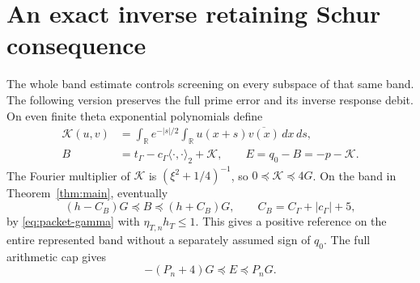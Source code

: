\documentclass[11pt]{article}
\theoremstyle{remark}
\newcommand{\R}{\mathbb R}
\newcommand{\ip}[2]{\langle #1,#2\rangle}
\newcommand{\tg}{t_\Gamma}
\newcommand{\cg}{c_\Gamma}
\begin{document}
\section{An exact inverse retaining Schur consequence}\label{sec:schur}
The whole band estimate controls screening on every subspace of that same
band. The following version preserves the full prime error and its
inverse response debit.
On even finite theta exponential polynomials define
\begin{equation}\label{eq:reference}
\begin{split}
 \mathcal K(u,v)&=\int_\R e^{-|s|/2}
                     \int_\R u(x+s)\overline{v(x)}\,dx\,ds,\\
 B&=\tg-\cg\ip{\cdot}{\cdot}_2+\mathcal K,\qquad
 E=q_0-B=-p-\mathcal K.
\end{split}
\end{equation}
The Fourier multiplier of $\mathcal K$ is $(\xi^2+1/4)^{-1}$, so
$0\preceq\mathcal K\preceq4G$.
On the band in Theorem~\ref{thm:main}, eventually
\begin{equation}\label{eq:reference-bound}
 (h-C_B)G\preceq B\preceq(h+C_B)G,\qquad
 C_B=C_\Gamma+|\cg|+5,
\end{equation}
by \eqref{eq:packet-gamma} with $\eta_{T,n}h_T\le1$.
This gives a positive reference on the entire represented band without
a separately assumed sign of $q_0$.
The full arithmetic cap gives
\begin{equation}\label{eq:E-bound}
 -(P_n+4)G\preceq E\preceq P_nG.
\end{equation}
\end{document}
